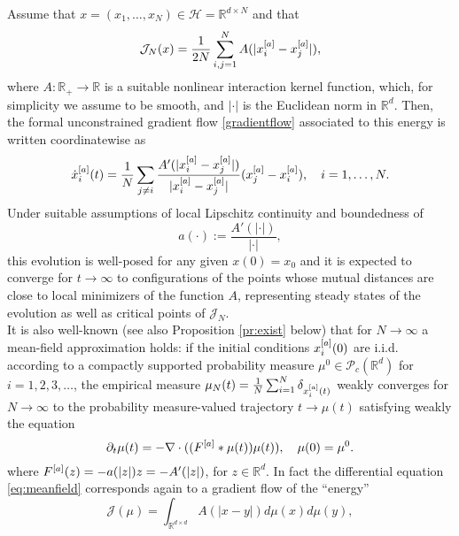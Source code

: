 Assume that $x=(x_1,\dots,x_N) \in \mathcal H= \mathbb R^{d\times N}$ and that 
$$
\mathcal J_N(x) = \frac{1}{2N} \sum_{i,j=1}^N A(| x^{[a]}_i -  x^{[a]}_j |),
$$
where $A:\mathbb R_+ \to \mathbb R$ is a suitable nonlinear interaction kernel function, which, for simplicity we assume to be smooth, and $|\cdot|$ is the Euclidean norm in $\mathbb R^d$. Then, the formal unconstrained gradient flow \eqref{gradientflow} associated to this energy is written coordinatewise as
\begin{equation}\label{fdgradientflow}
\dot{x}^{[a]}_i(t) = \frac{1}{N} \sum_{j \neq i} \frac{A'(| x^{[a]}_i -  x^{[a]}_j |)}{| x^{[a]}_i -  x^{[a]}_j |} (x^{[a]}_j - x^{[a]}_i), \quad i=1,\dots,N.
\end{equation}
Under suitable assumptions of local Lipschitz continuity and boundedness of 
\begin{equation}\label{intker}
a(\cdot) := \frac{A'(|\cdot|)}{| \cdot |},
\end{equation} this evolution is well-posed for any given $x(0)=x_0$ and it is expected to converge for $t \to \infty$ to configurations of the points whose mutual distances are close to local minimizers of the function $A$, representing steady states of the evolution as well as critical points of $\mathcal J_N$.\\
It is also well-known \cite{AGS} (see also Proposition \ref{pr:exist} below) that for $N \to \infty$ a mean-field approximation holds: if the initial conditions $x^{[a]}_i(0)$ are i.i.d. according to a compactly supported probability measure $\mu^0 \in \mathcal P_c(\mathbb R^d)$ for $i=1,2,3, \dots$, the empirical measure $\mu_N(t) = \frac{1}{N} \sum_{i=1}^N \delta_{x^{[a]}_i(t)}$ weakly converges for $N \to \infty$  to the probability measure-valued trajectory $t \to \mu(t)$ satisfying weakly the equation
\begin{equation}\label{eq:meanfield}
\partial_t \mu(t) = - \nabla \cdot ((F^{[a]} * \mu(t)) \mu(t)), \quad \mu(0)=\mu^0.
\end{equation}
where $F^{[a]}(z) =-a(|z|)z=-A'(|z|)$, for $z \in \mathbb R^{d}$. In fact the differential equation \eqref{eq:meanfield} corresponds again to a gradient flow of the ``energy''
$$
\mathcal J (\mu) = \int_{\mathbb R^{d\times d}} A(| x-  y |) d \mu(x) d\mu(y),
$$
